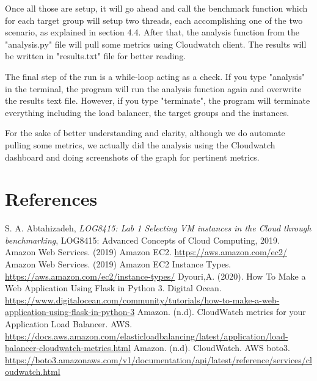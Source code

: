 \documentclass[12pt]{article}
\begin{document}
	\bigskip
	
	Once all those are setup, it will go ahead and call the benchmark function which for each target group will setup two threads, each accomplishing one of the two scenario, as explained in section 4.4. After that, the analysis function from the "analysis.py" file will pull some metrics using Cloudwatch client. The results will be written in "results.txt" file for better reading. 
	
	\bigskip
	
	The final step of the run is a while-loop acting as a check. If you type "analysis" in the terminal, the program will run the analysis function again and overwrite the results text file. However, if you type "terminate", the program will terminate everything including the load balancer, the target groups and the instances.
	
	\bigskip

    For the sake of better understanding and clarity, although we do automate pulling some metrics, we actually did the analysis using the Cloudwatch dashboard and doing screenshots of the graph for pertinent metrics.

\section{References} \label{sec:references}
	
	\begin{thebibliography} {}
		 S. A. Abtahizadeh, \emph{LOG8415: Lab 1 Selecting VM instances in the Cloud through benchmarking}, LOG8415: Advanced Concepts of Cloud Computing, 2019.
		 Amazon Web Services. (2019) Amazon EC2. \url{https://aws.amazon.com/ec2/}
		 Amazon Web Services. (2019) Amazon EC2 Instance Types. \url{https://aws.amazon.com/ec2/instance-types/}
		 Dyouri,A. (2020). How To Make a Web Application Using Flask in Python 3. Digital Ocean.  \url{https://www.digitalocean.com/community/tutorials/how-to-make-a-web-application-using-flask-in-python-3}
		 Amazon. (n.d). CloudWatch metrics for your Application Load Balancer. AWS. \url{https://docs.aws.amazon.com/elasticloadbalancing/latest/application/load-balancer-cloudwatch-metrics.html}
		 Amazon. (n.d). CloudWatch. AWS boto3. \url{https://boto3.amazonaws.com/v1/documentation/api/latest/reference/services/cloudwatch.html}
	\end{thebibliography}
\end{document}
